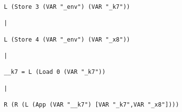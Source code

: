\begin{landscape}
\begin{lstlisting}[basicstyle=\fontsize{5.5}{6.5}\selectfont\ttfamily]
                                                                                                       L (Store 3 (VAR "_env") (VAR "_k7"))
                                                                                                                        |
                                                                                                       L (Store 4 (VAR "_env") (VAR "_x8"))
                                                                                                                        |
                                                                                                          __k7 = L (Load 0 (VAR "_k7"))
                                                                                                                        |
                                                                                                R (R (L (App (VAR "__k7") [VAR "_k7",VAR "_x8"])))

\end{lstlisting}
\end{landscape}
\clearpage

